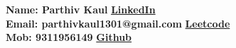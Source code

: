 {\bf Name: Parthiv Kaul } \hfill {\bf \href{https://www.linkedin.com/in/parthiv-kaul-351a43244}{LinkedIn}}\\
{\bf Email: parthivkaul1301@gmail.com} \hfill {\bf \href{https://leetcode.com/u/kaulpk/}{Leetcode}}\\
{\bf Mob: 9311956149} \hfill {\bf \href{https://github.com/kaulparthiv}{Github}}\\

